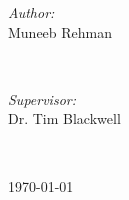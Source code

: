 \begin{titlepage}
\begin{minipage}{0.4\textwidth}
\begin{flushleft} \large
\emph{Author:}\\
Muneeb Rehman 



\end{flushleft}
\end{minipage}
~
\begin{minipage}{0.4\textwidth}
\begin{flushright} \large
\emph{Supervisor:} \\
Dr. Tim Blackwell
\end{flushright}
\end{minipage}\\[2cm]
\makeatother


{\large \today}\\[2cm] %

\vfill %

\end{titlepage}
\cleardoublepage